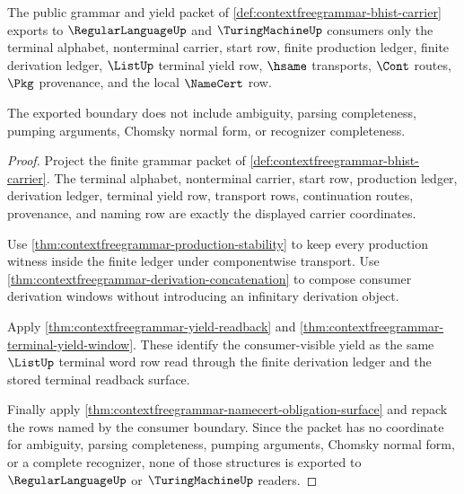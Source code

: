 \begin{theorem}
\label{thm:contextfreegrammar-regularlanguage-turingmachine-bridge-boundary}
The public grammar and yield packet of
\autoref{def:contextfreegrammar-bhist-carrier} exports to
$\RegularLanguageUp$ and $\TuringMachineUp$ consumers only the terminal
alphabet, nonterminal carrier, start row, finite production ledger, finite
derivation ledger, $\ListUp$ terminal yield row, $\hsame$ transports,
$\Cont$ routes, $\Pkg$ provenance, and the local $\NameCert$ row.

The exported boundary does not include ambiguity, parsing completeness,
pumping arguments, Chomsky normal form, or recognizer completeness.
\end{theorem}
\begin{proof}
Project the finite grammar packet of
\autoref{def:contextfreegrammar-bhist-carrier}. The terminal alphabet,
nonterminal carrier, start row, production ledger, derivation ledger,
terminal yield row, transport rows, continuation routes, provenance, and
naming row are exactly the displayed carrier coordinates.

Use \autoref{thm:contextfreegrammar-production-stability} to keep every
production witness inside the finite ledger under componentwise transport.
Use \autoref{thm:contextfreegrammar-derivation-concatenation} to compose
consumer derivation windows without introducing an infinitary derivation
object.

Apply \autoref{thm:contextfreegrammar-yield-readback} and
\autoref{thm:contextfreegrammar-terminal-yield-window}. These identify the
consumer-visible yield as the same $\ListUp$ terminal word row read through
the finite derivation ledger and the stored terminal readback surface.

Finally apply
\autoref{thm:contextfreegrammar-namecert-obligation-surface} and repack the
rows named by the consumer boundary. Since the packet has no coordinate for
ambiguity, parsing completeness, pumping arguments, Chomsky normal form, or a
complete recognizer, none of those structures is exported to
$\RegularLanguageUp$ or $\TuringMachineUp$ readers.
\end{proof}

